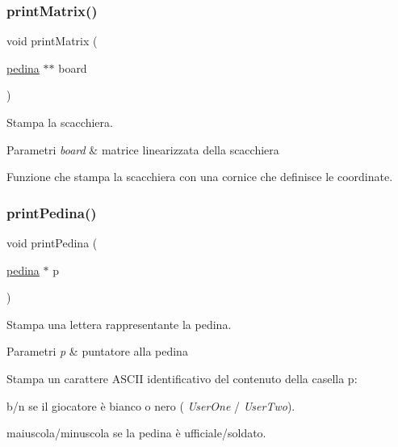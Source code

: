 \subsubsection{\texorpdfstring{print\+Matrix()}{printMatrix()}}
{\footnotesize\ttfamily void print\+Matrix (\begin{DoxyParamCaption}\item[{\hyperlink{ml__lib_8h_a71fee95122b31f5cb0b07d9c16ffa3a5}{pedina} $\ast$$\ast$}]{board }\end{DoxyParamCaption})}



Stampa la scacchiera. 


\begin{DoxyParams}{Parametri}
{\em board} & matrice linearizzata della scacchiera\\
\hline
\end{DoxyParams}
Funzione che stampa la scacchiera con una cornice che definisce le coordinate. \mbox{\label{group__Funzioni_ga724261d45664de95115edbec3fec7aef}} 
\subsubsection{\texorpdfstring{print\+Pedina()}{printPedina()}}
{\footnotesize\ttfamily void print\+Pedina (\begin{DoxyParamCaption}\item[{\hyperlink{ml__lib_8h_a71fee95122b31f5cb0b07d9c16ffa3a5}{pedina} $\ast$}]{p }\end{DoxyParamCaption})}



Stampa una lettera rappresentante la pedina. 


\begin{DoxyParams}{Parametri}
{\em p} & puntatore alla pedina\\
\hline
\end{DoxyParams}
Stampa un carattere A\+S\+C\+II identificativo del contenuto della casella p\+: 
\begin{DoxyItemize}
\item b/n se il giocatore è bianco o nero ( {\itshape User\+One} / {\itshape User\+Two}). 
\item maiuscola/minuscola se la pedina è ufficiale/soldato. 
\end{DoxyItemize}\mbox{\label{group__Funzioni_gafa3767d5c549d555cf1817fe57c614fc}} 
